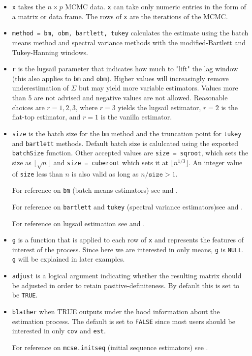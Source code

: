\documentclass[11pt]{article}\usepackage[]{graphicx}\usepackage[]{color}
\begin{document}
\begin{itemize}
\item \texttt{x} takes the $n \times p$ MCMC data. \texttt{x} can take only numeric entries in the form of a matrix or data frame. The rows of \texttt{x} are the iterations of the MCMC.

\item \texttt{method = bm, obm, bartlett, tukey} calculates the estimate using the batch means method and spectral variance methods with the modified-Bartlett and Tukey-Hanning windows.

\item \texttt{r} is the lugsail parameter that indicates how much to "lift" the lag window (this also  applies to \texttt{bm} and \texttt{obm}). Higher values will increasingly remove underestimation of $\Sigma$ but may yield more variable estimators. Values more than 5 are not advised and negative values are not allowed. Reasonable choices are $r = 1, 2, 3$, where $r = 3$ yields the lugsail estimator, $r = 2$ is the flat-top estimator, and $r = 1$ is the vanilla estimator. 

\item \texttt{size} is the batch size for the \texttt{bm} method and the truncation point for \texttt{tukey} and \texttt{bartlett} methods. Default batch size is calulcated using the exported \texttt{batchSize} function. Other accepted values are \texttt{size = sqroot}, which sets the size as $\lfloor \sqrt{n} \rfloor$ and \texttt{size = cuberoot} which sets it at $\lfloor n^{1/3} \rfloor$. An integer value of \texttt{size} less than $n$ is also valid as long as $n/\texttt{size} > 1$.

For reference on \texttt{bm} (batch means estimators) see \cite{jones2006fixed} and \cite{vats:fleg:jones:2017b}.

For reference on \texttt{bartlett} and \texttt{tukey} (spectral variance estimators)see \cite{flegal2010batch} and \cite{vats2015strong}.

For reference on lugsail estimation see \cite{liu:fleg:2018} and \cite{vats:fleg:2018}.

\item \texttt{g} is a function that is applied to each row of \texttt{x} and represents the features of interest of the process. Since here we are interested in only means, \texttt{g} is \texttt{NULL}. \texttt{g} will be explained in later examples.

\item \texttt{adjust} is a logical argument indicating whether the resulting matrix should be adjusted in order to retain positive-definiteness. By default this is set to be \texttt{TRUE}.

\item \texttt{blather} when TRUE outputs under the hood information about the estimation process. The default is set to \texttt{FALSE} since most users should be interested in only \texttt{cov} and \texttt{est}.

For reference on \texttt{mcse.initseq} (initial sequence estimators) see \cite{dai2017multivariate}.
\end{itemize}
\end{document}
